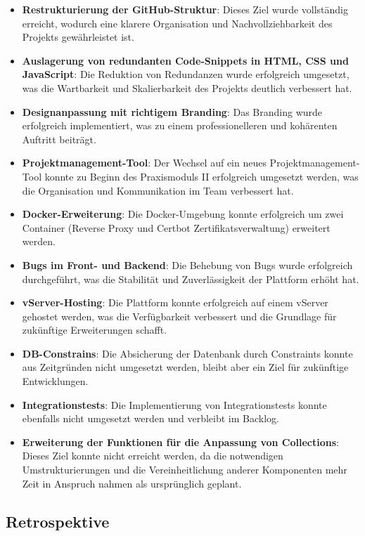 \begin{itemize}[noitemsep]
    \item \textbf{Restrukturierung der GitHub-Struktur}: Dieses Ziel wurde vollständig erreicht, wodurch eine klarere Organisation und Nachvollziehbarkeit des Projekts gewährleistet ist.
    \item \textbf{Auslagerung von redundanten Code-Snippets in HTML, CSS und JavaScript}: Die Reduktion von Redundanzen wurde erfolgreich umgesetzt, was die Wartbarkeit und Skalierbarkeit des Projekts deutlich verbessert hat.
    \item \textbf{Designanpassung mit richtigem Branding}: Das Branding wurde erfolgreich implementiert, was zu einem professionelleren und kohärenten Auftritt beiträgt.
    \item \textbf{Projektmanagement-Tool}: Der Wechsel auf ein neues Projektmanagement-Tool konnte zu Beginn des Praxismoduls II erfolgreich umgesetzt werden, was die Organisation und Kommunikation im Team verbessert hat.
    \item \textbf{Docker-Erweiterung}: Die Docker-Umgebung konnte erfolgreich um zwei Container (Reverse Proxy und Certbot Zertifikatsverwaltung) erweitert werden.
    \item \textbf{Bugs im Front- und Backend}: Die Behebung von Bugs wurde erfolgreich durchgeführt, was die Stabilität und Zuverlässigkeit der Plattform erhöht hat.
    \item \textbf{vServer-Hosting}: Die Plattform konnte erfolgreich auf einem vServer gehostet werden, was die Verfügbarkeit verbessert und die Grundlage für zukünftige Erweiterungen schafft.
    \item \textbf{DB-Constrains}: Die Absicherung der Datenbank durch Constraints konnte aus Zeitgründen nicht umgesetzt werden, bleibt aber ein Ziel für zukünftige Entwicklungen.
    \item \textbf{Integrationstests}: Die Implementierung von Integrationstests konnte ebenfalls nicht umgesetzt werden und verbleibt im Backlog.
    \item \textbf{Erweiterung der Funktionen für die Anpassung von Collections}: Dieses Ziel konnte nicht erreicht werden, da die notwendigen Umstrukturierungen und die Vereinheitlichung anderer Komponenten mehr Zeit in Anspruch nahmen als ursprünglich geplant.
\end{itemize}

\newpage

\subsection{Retrospektive}\label{subsec:retrospektive}

